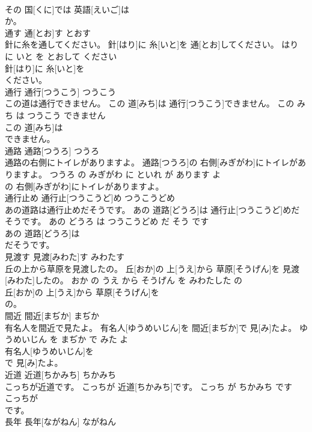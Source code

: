 \documentclass[8pt]{extreport}
\begin{document}
\begin{CJK}{UTF8}{min}
\\	その 国[くに]では 英語[えいご]は
\\	か。			
\\	通す	通[とお]す	とおす	
\\	針に糸を通してください。	針[はり]に 糸[いと]を 通[とお]してください。	はり に いと を とおして ください	
\\	針[はり]に 糸[いと]を
\\	ください。			
\\	通行	通行[つうこう]	つうこう	
\\	この道は通行できません。	この 道[みち]は 通行[つうこう]できません。	この みち は つうこう できません	
\\	この 道[みち]は
\\	できません。			
\\	通路	通路[つうろ]	つうろ	
\\	通路の右側にトイレがありますよ。	通路[つうろ]の 右側[みぎがわ]にトイレがありますよ。	つうろ の みぎがわ に といれ が あります よ	
\\	の 右側[みぎがわ]にトイレがありますよ。			
\\	通行止め	通行止[つうこうど]め	つうこうどめ	
\\	あの道路は通行止めだそうです。	あの 道路[どうろ]は 通行止[つうこうど]めだそうです。	あの どうろ は つうこうどめ だ そう です	
\\	あの 道路[どうろ]は
\\	だそうです。			
\\	見渡す	見渡[みわた]す	みわたす	
\\	丘の上から草原を見渡したの。	丘[おか]の 上[うえ]から 草原[そうげん]を 見渡[みわた]したの。	おか の うえ から そうげん を みわたした の	
\\	丘[おか]の 上[うえ]から 草原[そうげん]を
\\	の。			
\\	間近	間近[まぢか]	まぢか	
\\	有名人を間近で見たよ。	有名人[ゆうめいじん]を 間近[まぢか]で 見[み]たよ。	ゆうめいじん を まぢか で みた よ	
\\	有名人[ゆうめいじん]を
\\	で 見[み]たよ。			
\\	近道	近道[ちかみち]	ちかみち	
\\	こっちが近道です。	こっちが 近道[ちかみち]です。	こっち が ちかみち です	
\\	こっちが
\\	です。			
\\	長年	長年[ながねん]	ながねん	

\end{CJK}
\end{document}
